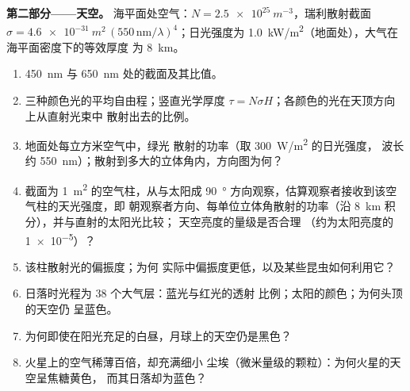 \begin{problem}
\medskip
\noindent\textbf{第二部分——天空。}
海平面处空气：$N = \qty{2.5e25}{m^{-3}}$，瑞利散射截面 $\sigma =
\qty{4.6e-31}{m^2}\,(550\,\text{nm}/\lambda)^4$；日光强度为
\qty{1.0}{kW/m^2}（地面处），大气在海平面密度下的等效厚度
为 \qty{8}{km}。
\begin{enumerate}[resume]
  \item \qty{450}{nm} 与 \qty{650}{nm} 处的截面及其比值。
  \item 三种颜色光的平均自由程；竖直光学厚度
        $\tau = N\sigma H$；各颜色的光在天顶方向上从直射光束中
        散射出去的比例。
  \item 地面处每立方米空气中，绿光
        散射的功率（取 \qty{300}{W/m^2} 的日光强度，
        波长约 \qty{550}{nm}）；散射到多大的立体角内，方向图为何？
  \item 截面为 \qty{1}{m^2} 的空气柱，从与太阳成 \qty{90}{\degree}
        方向观察，估算观察者接收到该空气柱的天光强度，即
        朝观察者方向、每单位立体角散射的功率（沿
        \qty{8}{km} 积分），并与直射的太阳光比较；
        天空亮度的量级是否合理
        （约为太阳亮度的 \qty{1e-5}{}）？
  \item 该柱散射光的偏振度；为何
        实际中偏振度更低，以及某些昆虫如何利用它？
  \item 日落时光程为 $38$ 个大气层：蓝光与红光的透射
        比例；太阳的颜色；为何头顶的天空仍
        呈蓝色。
  \item 为何即使在阳光充足的白昼，月球上的天空仍是黑色？
  \item 火星上的空气稀薄百倍，却充满细小
        尘埃（微米量级的颗粒）：为何火星的天空呈焦糖黄色，
        而其日落却为蓝色？
\end{enumerate}


\end{problem}
